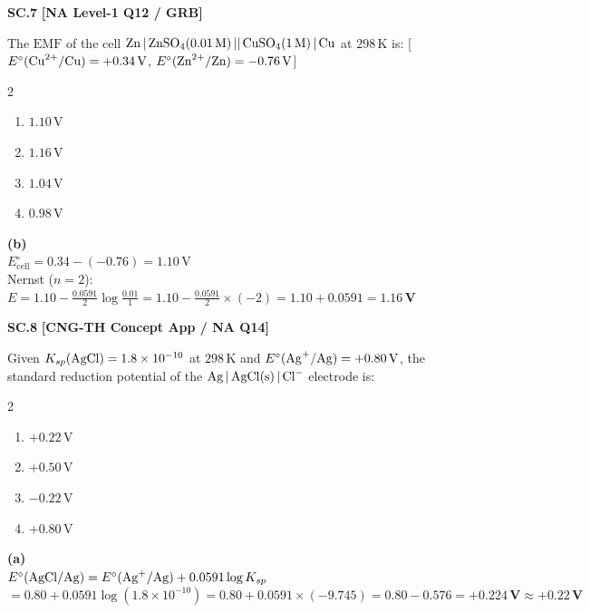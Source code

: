 \begin{problembox}
\textbf{SC.7} \hfill \textbf{[NA Level-1 Q12 / GRB]}

The $\text{EMF}$ of the cell $\ce{Zn | ZnSO4(0.01 M) || CuSO4(1 M) | Cu}$ at $298\,\text{K}$ is: [$E^\circ(\ce{Cu^2+/Cu})=+0.34\,\text{V}$, $E^\circ(\ce{Zn^2+/Zn})=-0.76\,\text{V}$]
\begin{multicols}{2}
\begin{enumerate}[label=(\alph*)]
    \item $1.10\,\text{V}$
    \item $1.16\,\text{V}$
    \item $1.04\,\text{V}$
    \item $0.98\,\text{V}$
\end{enumerate}
\end{multicols}
\end{problembox}
\begin{solution}
\textbf{(b)}\\
$E^\circ_{\text{cell}} = 0.34 - (-0.76) = 1.10\,\text{V}$\\
Nernst ($n=2$): $E = 1.10 - \frac{0.0591}{2}\log\frac{0.01}{1} = 1.10 - \frac{0.0591}{2}\times(-2) = 1.10 + 0.0591 = \mathbf{1.16\,\text{V}}$
\end{solution}

\begin{problembox}
\textbf{SC.8} \hfill \textbf{[CNG-TH Concept App / NA Q14]}

Given $K_{sp}(\ce{AgCl}) = 1.8\times10^{-10}$ at $298\,\text{K}$ and $E^\circ(\ce{Ag+/Ag}) = +0.80\,\text{V}$, the standard reduction potential of the $\ce{Ag | AgCl(s) | Cl-}$ electrode is:
\begin{multicols}{2}
\begin{enumerate}[label=(\alph*)]
    \item $+0.22\,\text{V}$
    \item $+0.50\,\text{V}$
    \item $-0.22\,\text{V}$
    \item $+0.80\,\text{V}$
\end{enumerate}
\end{multicols}
\end{problembox}
\begin{solution}
\textbf{(a)}\\
$E^\circ(\ce{AgCl/Ag}) = E^\circ(\ce{Ag+/Ag}) + 0.0591\log K_{sp}$\\
$= 0.80 + 0.0591\log(1.8\times10^{-10}) = 0.80 + 0.0591\times(-9.745) = 0.80 - 0.576 = \mathbf{+0.224\,\text{V} \approx +0.22\,\text{V}}$
\end{solution}

